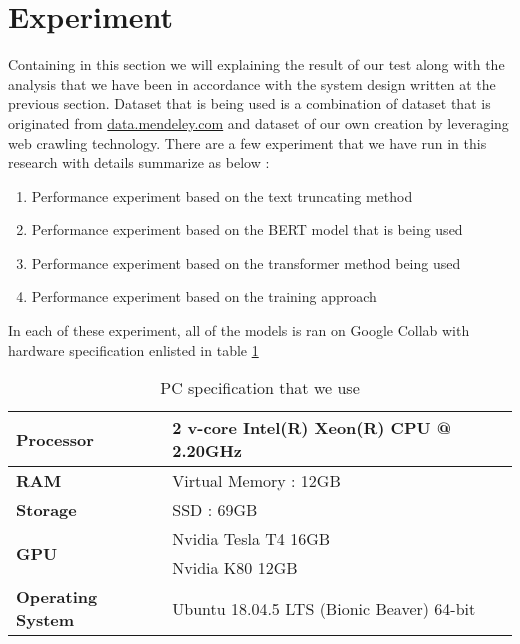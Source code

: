 \section{Experiment}
\label{sec:experiment}

Containing in this section we will explaining the result of our test along with the analysis that we have been in accordance with the system design written at the previous section. Dataset that is being used is a combination of dataset that is originated from \url{data.mendeley.com} and dataset of our own creation by leveraging web crawling technology. There are a few experiment that we have run in this research with details summarize as below :

\begin{enumerate}[nolistsep]
  \item Performance experiment based on the text truncating method
  \item Performance experiment based on the BERT model that is being used
  \item Performance experiment based on the transformer method being used
  \item Performance experiment based on the training approach
\end{enumerate}

In each of these experiment, all of the models is ran on Google Collab with hardware specification enlisted in table \ref{tab:specs_collab}

\begin{table}[h]
  \caption{PC specification that we use}
  \label{tab:specs_collab}
  \centering
  \begin{tabular}{|l|l|}
    \hline
    \textbf{Processor}            & 2 v-core Intel(R) Xeon(R) CPU @ 2.20GHz   \\ \hline
    \textbf{RAM}                  & Virtual Memory : 12GB                     \\ \hline
    \textbf{Storage}              & SSD : 69GB                                \\ \hline
    \multirow{2}{*}{\textbf{GPU}} & Nvidia Tesla T4 16GB                      \\ \cline{2-2}
                                  & Nvidia K80 12GB                           \\ \hline
    \textbf{Operating System}     & Ubuntu 18.04.5 LTS (Bionic Beaver) 64-bit \\ \hline
  \end{tabular}
\end{table}

